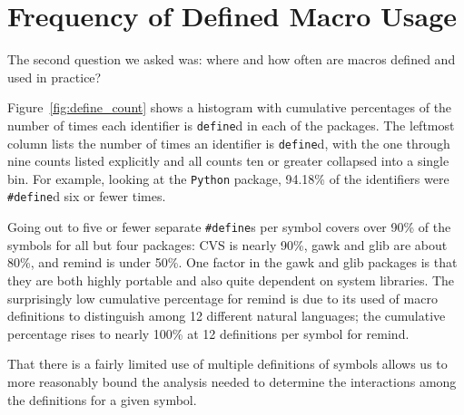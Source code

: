 \section{Frequency of Defined Macro Usage}\label{sec:usage}

The second question we asked was: where and how often are macros
defined and used in practice?  

%
%


Figure~\ref{fig:define_count} shows a histogram with cumulative
percentages of the number of times each identifier is \verb+define+d
in each of the packages.  The leftmost column lists the number of
times an identifier is \verb+define+d, with the one through nine counts
listed explicitly and all counts ten or greater collapsed into a
single bin.  
For example, looking at the \verb+Python+ package, 94.18\% of
the identifiers were \verb+#define+d six or fewer times.  

Going out to five or fewer separate \verb+#define+s per symbol covers
over 90\% of the symbols for all but four packages: CVS is nearly
90\%, gawk and glib are about 80\%, and remind is under 50\%.  One
factor in the gawk and glib packages is that they are both highly
portable and also quite dependent on system libraries.  The
surprisingly low cumulative percentage for remind is due to its used
of macro definitions to distinguish among 12 different natural
languages; the cumulative percentage rises to nearly 100\% at 12
definitions per symbol for remind.  

That there is a fairly limited use of multiple definitions of symbols
allows us to more reasonably bound the analysis needed to determine
the interactions among the definitions for a given symbol.

